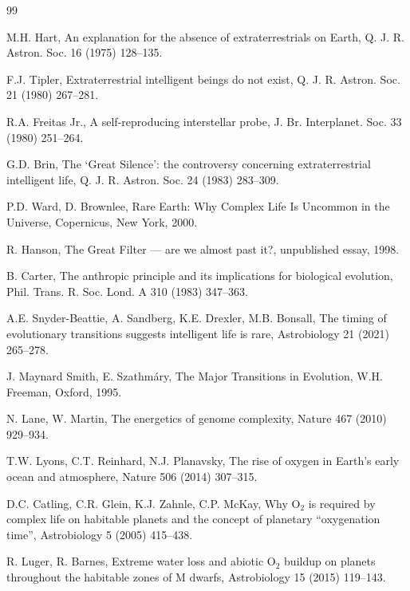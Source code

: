 \documentclass[preprint,12pt]{elsarticle}
\theoremstyle{definition}
\begin{document}
\begin{thebibliography}{99}

 M.H. Hart, An explanation for the absence of extraterrestrials on Earth, Q. J. R. Astron. Soc. 16 (1975) 128--135.

 F.J. Tipler, Extraterrestrial intelligent beings do not exist, Q. J. R. Astron. Soc. 21 (1980) 267--281.

 R.A. Freitas Jr., A self-reproducing interstellar probe, J. Br. Interplanet. Soc. 33 (1980) 251--264.

 G.D. Brin, The `Great Silence': the controversy concerning extraterrestrial intelligent life, Q. J. R. Astron. Soc. 24 (1983) 283--309.

 P.D. Ward, D. Brownlee, Rare Earth: Why Complex Life Is Uncommon in the Universe, Copernicus, New York, 2000.

 R. Hanson, The Great Filter --- are we almost past it?, unpublished essay, 1998.

 B. Carter, The anthropic principle and its implications for biological evolution, Phil. Trans. R. Soc. Lond. A 310 (1983) 347--363.

 A.E. Snyder-Beattie, A. Sandberg, K.E. Drexler, M.B. Bonsall, The timing of evolutionary transitions suggests intelligent life is rare, Astrobiology 21 (2021) 265--278.

 J. Maynard Smith, E. Szathm\'ary, The Major Transitions in Evolution, W.H. Freeman, Oxford, 1995.

 N. Lane, W. Martin, The energetics of genome complexity, Nature 467 (2010) 929--934.

 T.W. Lyons, C.T. Reinhard, N.J. Planavsky, The rise of oxygen in Earth's early ocean and atmosphere, Nature 506 (2014) 307--315.

 D.C. Catling, C.R. Glein, K.J. Zahnle, C.P. McKay, Why O$_2$ is required by complex life on habitable planets and the concept of planetary ``oxygenation time'', Astrobiology 5 (2005) 415--438.

 R. Luger, R. Barnes, Extreme water loss and abiotic O$_2$ buildup on planets throughout the habitable zones of M dwarfs, Astrobiology 15 (2015) 119--143.


\end{thebibliography}
\end{document}
